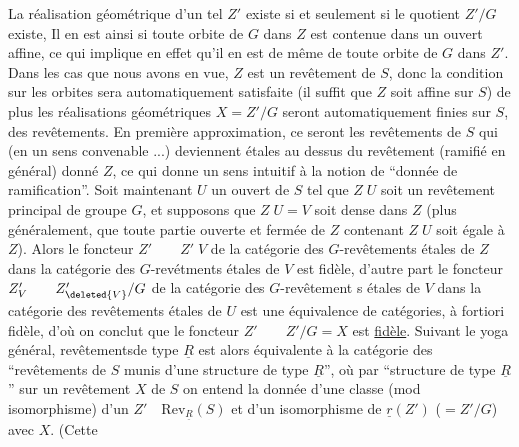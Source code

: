 La réalisation géométrique d'un tel $Z'$ existe si et seulement si le quotient $Z'/G$ existe,  Il en est ainsi si toute orbite de $G$ dans $Z$ est contenue dans un ouvert affine, ce qui implique en effet qu'il en est de même de toute orbite de $G$ dans $Z'$.  Dans les cas que nous avons en vue, $Z$ est un revêtement de $S$, donc la condition sur les orbites sera automatiquement satisfaite (il suffit que $Z$ soit affine sur $S$) de plus les réalisations géométriques $X=Z'/G$ seront automatiquement finies sur $S$,  des revêtements. En première approximation, ce seront les revêtements de $S$ qui (en  un sens convenable ...) deviennent étales au dessus du revêtement (ramifié en général) donné $Z$, ce qui donne un sens intuitif à la notion de ``donnée de ramification''. Soit maintenant $U$ un ouvert de $S$ tel que $Z\;U$ soit un revêtement principal de groupe $G$, et supposons que $Z\;U=V$ soit dense dans $Z$ (plus généralement, que toute partie ouverte et fermée de $Z$ contenant $Z\;U$  soit égale à $Z$). Alors le foncteur $Z'\qquad Z'\;V$ de la catégorie des $G$-revêtements étales de $Z$ dans la catégorie des $G$-revétments étales de $V$ est fidèle, d'autre part le foncteur $Z'_V\qquad Z'_{\deleted{V}}/G$ de la catégorie des $G$-revêtement s étales de $V$ dans la catégorie des revêtements étales de $U$ est une équivalence de catégories, à fortiori fidèle, d'où on conclut que le foncteur  $Z'\qquad Z'/G=X$ est \uline{fidèle}. Suivant le yoga général,  revêtementsde type $\underline{R}$  est alors équivalente à la catégorie des ``revêtements de $S$ munis d'une structure de type $\underline{R}$'', où par ``structure de type $\underline{R}$'' sur un revêtement $X$ de $S$ on entend la donnée d'une classe (mod isomorphisme) d'un $Z'\quad\mathrm{Rev}_{\underline{R}}(S)$ et d'un isomorphisme de $\underline{r}(Z')$ ($=Z'/G$) avec $X$. (Cette
